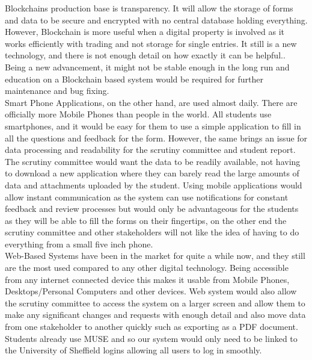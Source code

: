 \documentclass[../main.tex]{subfiles}
\begin{document}
\raggedright

Blockchains production base is transparency. It will allow the storage of forms and data to be secure and encrypted with no central database holding everything. However, Blockchain is more useful when a digital property is involved as it works efficiently with trading and not storage for single entries. It still is a new technology, and there is not enough detail on how exactly it can be helpful.\cite{vergeblockchain}. Being a new advancement, it might not be stable enough in the long run and education on a Blockchain based system would be required for further maintenance and bug fixing. \\[2mm]

Smart Phone Applications, on the other hand, are used almost daily. There are officially more Mobile Phones than people in the world\cite{morephones}. All students use smartphones, and it would be easy for them to use a simple application to fill in all the questions and feedback for the form. However, the same brings an issue for data processing and readability for the scrutiny committee and student report. The scrutiny committee would want the data to be readily available, not having to download a new application where they can barely read the large amounts of data and attachments uploaded by the student. Using mobile applications would allow instant communication as the system can use notifications for constant feedback and review processes but would only be advantageous for the students as they will be able to fill the forms on their fingertips, on the other end the scrutiny committee and other stakeholders will not like the idea of having to do everything from a small five inch phone. \\[2mm]

Web-Based Systems have been in the market for quite a while now, and they still are the most used compared to any other digital technology\cite{morewebsites}.
Being accessible from any internet connected device this makes it usable from Mobile Phones, Desktops/Personal Computers and other devices. Web system would also allow the scrutiny committee to access the system on a larger screen and allow them to make any significant changes and requests with enough detail and also move data from one stakeholder to another quickly such as exporting as a PDF document. Students already use MUSE\cite{muse} and so our system would only need to be linked to the University of Sheffield logins allowing all users to log in smoothly. 
\end{document}
